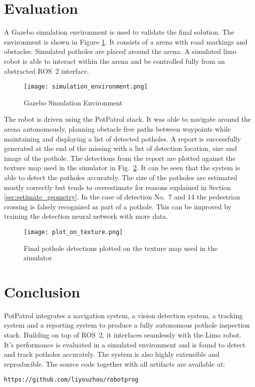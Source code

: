 \documentclass[conference]{IEEEtran}
\begin{document}
\section{Evaluation}

A Gazebo\cite{koenigDesignUseParadigms2004} simulation environment is used to validate the final solution. The environment is shown in Figure \ref{fig:gazebo}. It consists of a arena with road markings and obstacles. Simulated potholes are placed around the arena. A simulated limo robot is able to interact within the arena and be controlled fully from an abstracted ROS~2 interface.

\begin{figure}[h]
    \centering
    \texttt{[image: simulation\_environment.png]}
    \caption{Gazebo Simulation Environment}
    \label{fig:gazebo}
\end{figure}

The robot is driven using the PotPatrol stack. It was able to navigate around the arena autonomously, planning obstacle free paths between waypoints while maintaining and displaying a list of detected potholes. A report is successfully generated at the end of the missing with a list of detection location, size and image of the pothole. The detections from the report are plotted against the texture map used in the simulator in Fig.~\ref{fig:plot_on_texture}. It can be seen that the system is able to detect the potholes accurately. The size of the potholes are estimated mostly correctly but tends to overestimate for reasons explained in Section \ref{sec:estimate_geometry}. In the case of detection No.~7 and 14 the pedestrian crossing is falsely recognized as part of a pothole. This can be improved by training the detection neural network with more data.

\begin{figure}[h]
    \centering
    \texttt{[image: plot\_on\_texture.png]}
    \caption{Final pothole detections plotted on the texture map used in the simulator}
    \label{fig:plot_on_texture}
\end{figure}

\section{Conclusion}

PotPatrol integrates a navigation system, a vision detection system, a tracking system and a reporting system to produce a fully autonomous pothole inspection stack. Building on top of ROS~2, it interfaces seamlessly with the Limo robot. It's performance is evaluated in a simulated environment and is found to detect and track potholes accurately. The system is also highly extensible and reproducible. The source code together with all artifacts are available at:

\verb|https://github.com/liyouzhou/robotprog|



\end{document}
